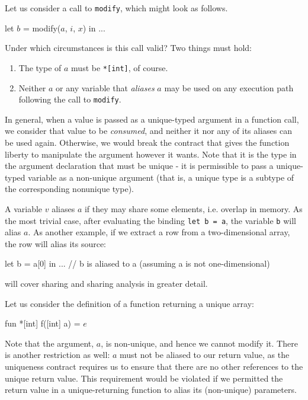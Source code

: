 \documentclass[oneside]{memoir}
\begin{document}
Let us consider a call to \texttt{modify}, which might look as
follows.

\begin{colorcode}
let \(b\) = modify(\(a\), \(i\), \(x\)) in
...
\end{colorcode}

Under which circumstances is this call valid?  Two things must hold:
\begin{enumerate}
\item The type of \texttt{$a$} must be \texttt{*[int]}, of course.

\item Neither \texttt{$a$} or any variable that \textit{aliases}
  \texttt{$a$} may be used on any execution path following the call to
  \texttt{modify}.
\end{enumerate}

In general, when a value is passed as a unique-typed argument in a
function call, we consider that value to be \textit{consumed}, and
neither it nor any of its aliases can be used again.  Otherwise, we
would break the contract that gives the function liberty to manipulate
the argument however it wants.  Note that it is the type in the
argument declaration that must be unique - it is permissible to pass a
unique-typed variable as a non-unique argument (that is, a unique type
is a subtype of the corresponding nonunique type).

A variable $v$ aliases $a$ if they may share some elements,
i.e. overlap in memory.  As the most trivial case, after evaluating
the binding \texttt{let b = a}, the variable \texttt{b} will alias
\texttt{$a$}.  As another example, if we extract a row from a
two-dimensional array, the row will alias its source:
\begin{colorcode}
let b = a[0] in
... // b is aliased to a (assuming a is not one-dimensional)
\end{colorcode}
 will cover sharing and sharing analysis in
greater detail.

Let us consider the definition of a function returning a unique array:

\begin{colorcode}
fun *[int] f([int] a) = \(e\)
\end{colorcode}

Note that the argument, \texttt{$a$}, is non-unique, and hence we
cannot modify it.  There is another restriction as well: \texttt{$a$}
must not be aliased to our return value, as the uniqueness contract
requires us to ensure that there are no other references to the unique
return value.  This requirement would be violated if we permitted the
return value in a unique-returning function to alias its (non-unique)
parameters.
\end{document}
